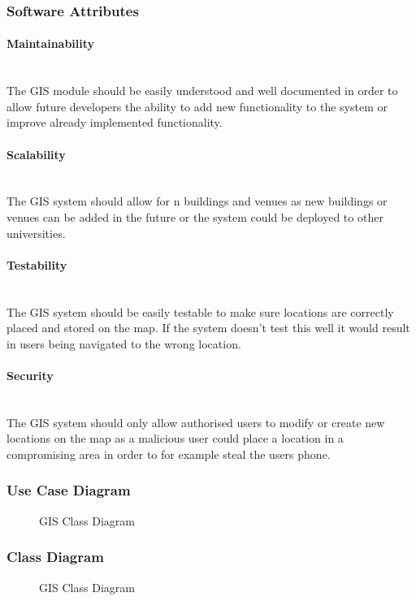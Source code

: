 \subsubsection{Software Attributes}
	
\paragraph{Maintainability}
\mbox{}\\
The GIS module should be easily understood and well documented in order to allow future developers the ability to add new functionality to the system or improve already implemented functionality.

\paragraph{Scalability}
\mbox{}\\
The GIS system should allow for n buildings and venues as new buildings or venues can be added in the future or the system could be deployed to other universities.

\paragraph{Testability}
\mbox{}\\
The GIS system should be easily testable to make sure locations are correctly placed and stored on the map. If the system doesn't test this well it would result in users being navigated to the wrong location.

\paragraph{Security}
\mbox{}\\
The GIS system should only allow authorised users to modify or create new locations on the map as a malicious user could place a location in a compromising area in order to for example steal the users phone.

\pagebreak
\subsubsection{Use Case Diagram}

	\begin{figure}[h!]
	\caption{GIS Class Diagram}
	\end{figure}
\pagebreak

\subsubsection{Class Diagram}
	\begin{figure}[h!]
	\caption{GIS Class Diagram}
	\end{figure}
